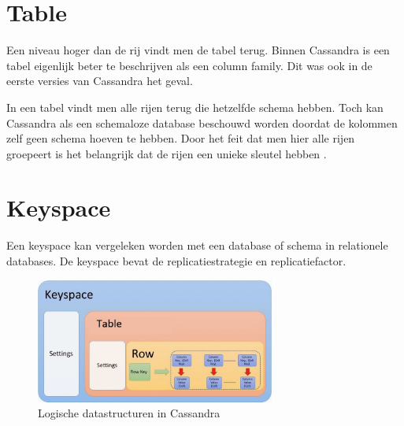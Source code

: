 \section{Table}
Een niveau hoger dan de rij vindt men de tabel terug.
Binnen Cassandra is een tabel eigenlijk beter te beschrijven als een column family.
Dit was ook in de eerste versies van Cassandra het geval.

In een tabel vindt men alle rijen terug die hetzelfde schema hebben.
Toch kan Cassandra als een schemaloze database beschouwd worden doordat de kolommen zelf geen schema hoeven te hebben.
Door het feit dat men hier alle rijen groepeert is het belangrijk dat de rijen een unieke sleutel hebben \citep{hewitt2010cassandra}.

\section{Keyspace}
Een keyspace kan vergeleken worden met een database of schema in relationele databases.
De keyspace bevat de replicatiestrategie en replicatiefactor.

\begin{figure}[H]
	\centering
	\includegraphics[width=0.7\textwidth]{img/4_data/data}
	\caption{Logische datastructuren in Cassandra}
	\label{fig:datastructure}
\end{figure}